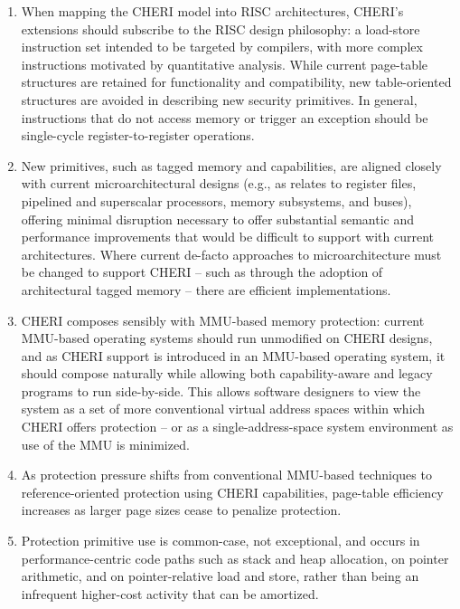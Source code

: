 \begin{enumerate}

\item When mapping the CHERI model into RISC architectures, CHERI's extensions
  should subscribe to the RISC design philosophy: a load-store instruction set
  intended to be targeted by compilers, with more complex instructions
  motivated by quantitative analysis.
  While current page-table structures
  are retained for functionality and compatibility, new
  table-oriented structures are avoided in describing new security primitives.
  In general, instructions that do not access memory or trigger an exception
  should be single-cycle register-to-register operations.

\item New primitives, such as tagged memory and capabilities, are aligned
  closely with current microarchitectural designs (e.g., as relates to
  register files, pipelined and superscalar processors, memory subsystems, and
  buses), offering minimal disruption necessary to offer substantial semantic
  and performance improvements that would be difficult to support with
  current architectures.
  Where current de-facto approaches to microarchitecture must be changed to
  support CHERI -- such as through the adoption of architectural tagged memory
  -- there are efficient implementations.

\item CHERI composes sensibly with MMU-based memory protection: current
  MMU-based operating systems should run unmodified on CHERI designs, and as
  CHERI support is introduced in an MMU-based operating system, it should
  compose naturally while allowing both capability-aware and legacy programs
  to run side-by-side.
  This allows software designers to view the system as a set of more
  conventional virtual address spaces within which CHERI offers protection --
  or as a single-address-space system environment as use of the MMU is
  minimized.

\item As protection pressure shifts from conventional MMU-based techniques to
  reference-oriented protection using CHERI capabilities, page-table
  efficiency increases as larger page sizes cease to penalize protection.

\item Protection primitive use is common-case, not exceptional, and occurs
  in performance-centric code paths such as stack and heap
  allocation, on pointer arithmetic, and on pointer-relative load and store,
  rather than being an infrequent higher-cost activity that can be amortized.


\end{enumerate}
